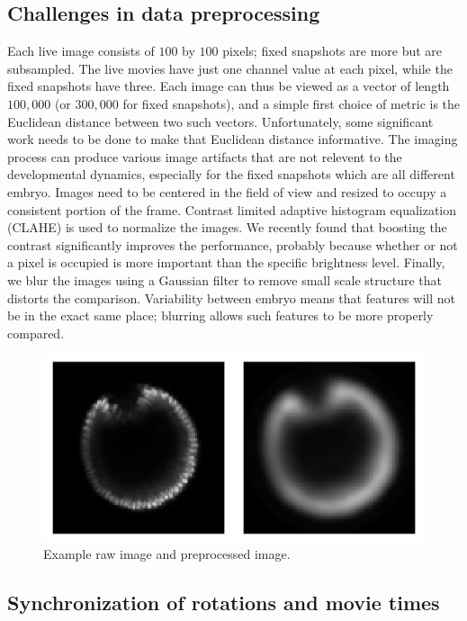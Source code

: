 \documentclass[12pt]{article}
\begin{document}
\subsection{Challenges in data preprocessing}

Each live image consists of $100$ by $100$ pixels; fixed snapshots are more but are subsampled. The live movies have just one channel value at each pixel, while the fixed snapshots have three. Each image can thus be viewed as a vector of length $100,000$ (or $300,000$ for fixed snapshots), and a simple first choice of metric is the Euclidean distance between two such vectors. Unfortunately, some significant work needs to be done to make that Euclidean distance informative. The imaging process can produce various image artifacts that are not relevent to the developmental dynamics, especially for the fixed snapshots which are all different embryo. Images need to be centered in the field of view and resized to occupy a consistent portion of the frame. Contrast limited adaptive histogram equalization (CLAHE) is used to normalize the images. We recently found that boosting the contrast significantly improves the performance, probably because whether or not a pixel is occupied is more important than the specific brightness level. Finally, we blur the images using a Gaussian filter to remove small scale structure that distorts the comparison. Variability between embryo means that features will not be in the exact same place; blurring allows such features to be more properly compared.

\begin{figure}[here]
\centering
\includegraphics[height=\liveheight]{figures/preprocess} \par
\caption{Example raw image and preprocessed image.}
\label{fig:pp}
\end{figure}

\subsection{Synchronization of rotations and movie times}
\end{document}

